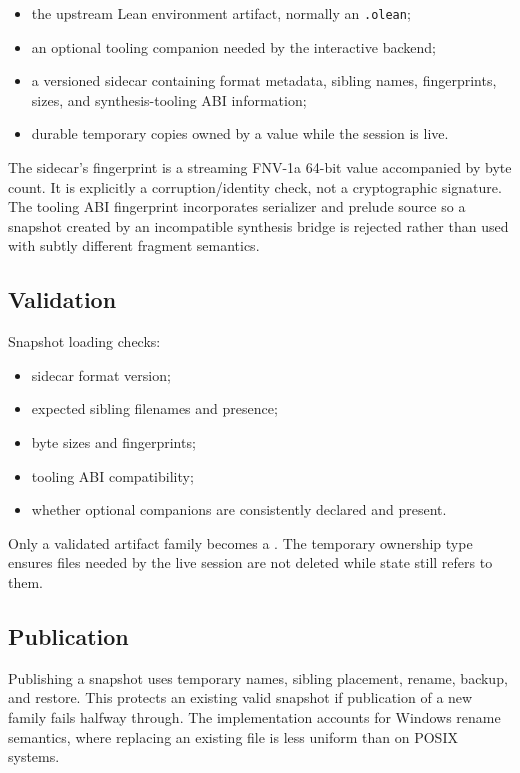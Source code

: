 \documentclass[10pt,letterpaper,oneside]{report}
\newcommand{\code}[1]{\texttt{\detokenize{#1}}}
\newcommand{\filepath}[1]{\nolinkurl{#1}}
\begin{document}
\begin{itemize}
  \item the upstream Lean environment artifact, normally an \filepath{.olean};
  \item an optional tooling companion needed by the interactive backend;
  \item a versioned sidecar containing format metadata, sibling names, fingerprints, sizes, and synthesis-tooling ABI information;
  \item durable temporary copies owned by a \code{SnapshotBase} value while the session is live.
\end{itemize}

The sidecar's fingerprint is a streaming FNV-1a 64-bit value accompanied by byte count. It is explicitly a corruption/identity check, not a cryptographic signature. The tooling ABI fingerprint incorporates serializer and prelude source so a snapshot created by an incompatible synthesis bridge is rejected rather than used with subtly different fragment semantics.

\subsection{Validation}

Snapshot loading checks:

\begin{itemize}
  \item sidecar format version;
  \item expected sibling filenames and presence;
  \item byte sizes and fingerprints;
  \item tooling ABI compatibility;
  \item whether optional companions are consistently declared and present.
\end{itemize}

Only a validated artifact family becomes a \code{SnapshotBase}. The temporary ownership type ensures files needed by the live session are not deleted while state still refers to them.

\subsection{Publication}

Publishing a snapshot uses temporary names, sibling placement, rename, backup, and restore. This protects an existing valid snapshot if publication of a new family fails halfway through. The implementation accounts for Windows rename semantics, where replacing an existing file is less uniform than on POSIX systems.
\end{document}
